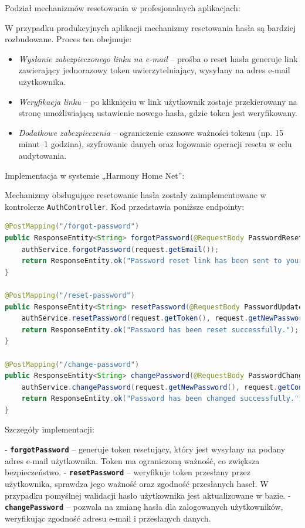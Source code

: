 Podział mechanizmów resetowania w profesjonalnych aplikacjach:

W przypadku produkcyjnych aplikacji mechanizmy resetowania hasła są bardziej rozbudowane. Proces ten obejmuje:
\begin{itemize}
    \item \emph{Wysłanie zabezpieczonego linku na e-mail} -- prośba o reset hasła generuje link zawierający jednorazowy token uwierzytelniający, wysyłany na adres e-mail użytkownika.
    \item \emph{Weryfikacja linku} -- po kliknięciu w link użytkownik zostaje przekierowany na stronę umożliwiającą ustawienie nowego hasła, gdzie token jest weryfikowany.
    \item \emph{Dodatkowe zabezpieczenia} -- ograniczenie czasowe ważności tokenu (np. 15 minut–1 godzina), szyfrowanie danych oraz logowanie operacji resetu w celu audytowania.
\end{itemize}

Implementacja w systemie „Harmony Home Net”:

Mechanizmy obsługujące resetowanie hasła zostały zaimplementowane w kontrolerze \texttt{AuthController}. Kod przedstawia poniższe endpointy:

\begin{lstlisting}[language=Java, caption=Fragment klasy \texttt{AuthController}]
@PostMapping("/forgot-password")
public ResponseEntity<String> forgotPassword(@RequestBody PasswordResetRequest request) {
    authService.forgotPassword(request.getEmail());
    return ResponseEntity.ok("Password reset link has been sent to your email.");
}

@PostMapping("/reset-password")
public ResponseEntity<String> resetPassword(@RequestBody PasswordUpdateRequest request) {
    authService.resetPassword(request.getToken(), request.getNewPassword(), request.getConfirmPassword());
    return ResponseEntity.ok("Password has been reset successfully.");
}

@PostMapping("/change-password")
public ResponseEntity<String> changePassword(@RequestBody PasswordChangeRequest request) {
    authService.changePassword(request.getNewPassword(), request.getConfirmPassword(), request.getEmail());
    return ResponseEntity.ok("Password has been changed successfully.");
}
\end{lstlisting}

Szczegóły implementacji:

- \textbf{\texttt{forgotPassword}} -- generuje token resetujący, który jest wysyłany na podany adres e-mail użytkownika. Token ma ograniczoną ważność, co zwiększa bezpieczeństwo.
- \textbf{\texttt{resetPassword}} -- weryfikuje token przesłany przez użytkownika, sprawdza jego ważność oraz zgodność przesłanych haseł. W przypadku pomyślnej walidacji hasło użytkownika jest aktualizowane w bazie.
- \textbf{\texttt{changePassword}} -- pozwala na zmianę hasła dla zalogowanych użytkowników, weryfikując zgodność adresu e-mail i przesłanych danych.

